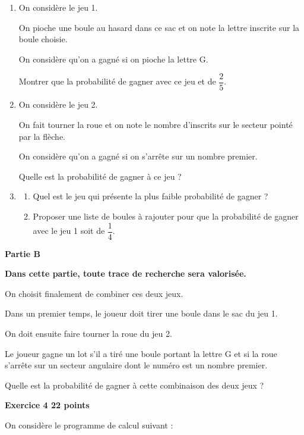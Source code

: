 \documentclass[11pt]{article}
\begin{document}
\medskip

\begin{enumerate}
\item On considère le jeu 1.

On pioche une boule au hasard dans ce sac et on note la lettre inscrite sur la boule choisie.

On considère qu'on a gagné si on pioche la lettre G.

Montrer que la probabilité de gagner avec ce jeu et de $\dfrac25$.
\item On considère le jeu 2.

On fait tourner la roue et on note le nombre d'inscrits sur le secteur pointé par la flèche. 

On considère qu'on a gagné si on s'arrête sur un nombre premier.

Quelle est la probabilité de gagner à ce jeu ?
\item 
	\begin{enumerate}
		\item Quel est le jeu qui présente la plus faible probabilité de gagner ?
		\item Proposer une liste de boules à rajouter pour que la probabilité de gagner avec le jeu 1 soit de $\dfrac14$.
	\end{enumerate}
\end{enumerate}

\bigskip

\textbf{Partie B}

\medskip

\textbf{Dans cette partie, toute trace de recherche sera valorisée.}

\medskip

On choisit finalement de combiner ces deux jeux.

Dans un premier temps, le joueur doit tirer une boule dans le sac du jeu 1.

On doit ensuite faire tourner la roue du jeu 2.

Le joueur gagne un lot s'il a tiré une boule portant la lettre G et si la roue s'arrête sur un secteur angulaire dont le numéro est un nombre premier.

Quelle est la probabilité de gagner à cette combinaison des deux jeux ?

\newpage

\textbf{\large{}Exercice 4 \hfill 22 points}

\medskip

On considère le programme de calcul suivant :
\end{document}
